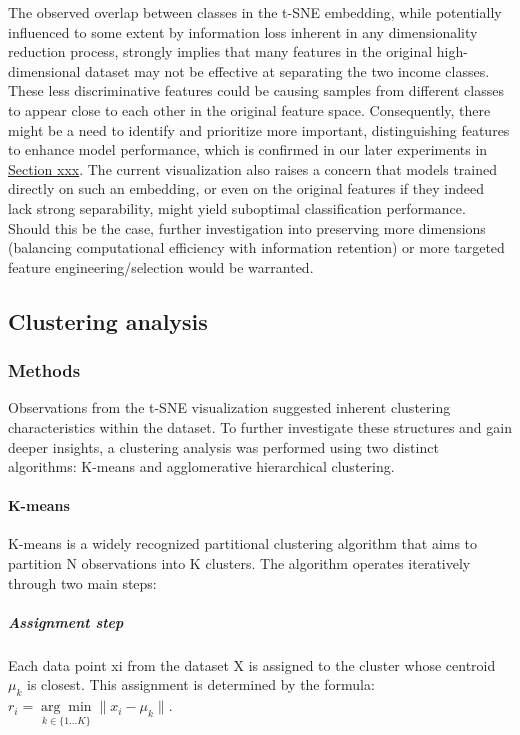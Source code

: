\documentclass{article}
\begin{document}
The observed overlap between classes in the t-SNE embedding, while potentially influenced to some extent by information loss inherent in any dimensionality reduction process, strongly implies that many features in the original high-dimensional dataset may not be effective at separating the two income classes. These less discriminative features could be causing samples from different classes to appear close to each other in the original feature space. Consequently, there might be a need to identify and prioritize more important, distinguishing features to enhance model performance, which is confirmed in our later experiments in \underline{Section xxx}. The current visualization also raises a concern that models trained directly on such an embedding, or even on the original features if they indeed lack strong separability, might yield suboptimal classification performance. Should this be the case, further investigation into preserving more dimensions (balancing computational efficiency with information retention) or more targeted feature engineering/selection would be warranted.


\subsection{Clustering analysis}





\subsubsection*{Methods}

Observations from the t-SNE visualization suggested inherent clustering characteristics within the dataset. To further investigate these structures and gain deeper insights, a clustering analysis was performed using two distinct algorithms: K-means and agglomerative hierarchical clustering.

\paragraph{K-means} K-means is a widely recognized partitional clustering algorithm that aims to partition N observations into K clusters. The algorithm operates iteratively through two main steps:

\subparagraph{Assignment step} Each data point xi from the dataset X is assigned to the cluster whose centroid $\mu_k$ is closest. This assignment is determined by the formula: $r_i = \underset{k\in \{1\ldots K\} }{\arg\min}{ \|x_{i}-\mu_k\| }$.
\end{document}
